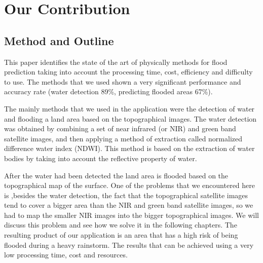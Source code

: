 \documentclass[12pt, a4paper]{report}
\begin{document}
\section{Our Contribution}
\subsection{Method and Outline}

\quad
This paper identifies the state of the art of physically methods for flood prediction taking into account the processing time, cost, efficiency and difficulty to use. The methods that we used shown a very significant performance and accuracy rate (water detection 89\%, predicting flooded areas 67\%).
\par

The mainly methods that we used in the application were the detection of water and flooding a land area based on the topographical images. The water detection was obtained by combining a set of near infrared (or NIR) and green band satellite images, and then applying a method of extraction called normalized difference water index (NDWI). This method is based on the extraction of water bodies by taking into account the reflective property of water.
\par 

After the water had been detected the land area is flooded based on the topographical map of the surface. One of the problems that we encountered here is ,besides the water detection, the fact that the topographical satellite images tend to cover a bigger area than the NIR and green band satellite images, so we had to map the smaller NIR images into the bigger topographical images. We will discuss this problem and see how we solve it in the following chapters. The resulting product of our application is an area that has a high risk of being flooded during a heavy rainstorm. The results that can be achieved using a very low processing time, cost and resources.
\par 
\end{document}
